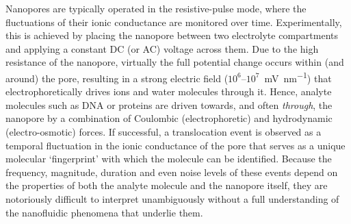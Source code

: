 \documentclass[journal=ancac3,manuscript=article,etalmode=truncate,maxauthors=0,layout=onecolumn]{achemso}
\begin{document}
Nanopores are typically operated in the resistive-pulse mode, where the fluctuations of their ionic
conductance are monitored over time.\cite{Bayley-2001,Dekker-2007,Maglia-2010,Venkatesan-2011} Experimentally,
this is achieved by placing the nanopore between two electrolyte compartments and applying a constant DC (or
AC) voltage across them. Due to the high resistance of the nanopore, virtually the full potential change
occurs within (and around) the pore, resulting in a strong electric field ($10^6$--$10^7$~\si{\mV\per\nm})
that electrophoretically drives ions and water molecules through
it.\cite{Wong-2007,Mao-2014,Haywood-2014,Laohakunakorn-2015} Hence, analyte molecules such as DNA or proteins
are driven towards, and often \emph{through}, the nanopore by a combination of Coulombic (electrophoretic) and
hydrodynamic (electro-osmotic) forces.\cite{Wong-2007,Grosberg-2010,Muthukumar-2010, Muthukumar-2014} If
successful, a translocation event is observed as a temporal fluctuation in the ionic conductance of the pore
that serves as a unique molecular `fingerprint' with which the molecule can be identified.\cite{Yusko-2017}
Because the frequency, magnitude, duration and even noise levels of these events depend on the properties of
both the analyte molecule and the nanopore itself, they are notoriously difficult to interpret unambiguously
without a full understanding of the nanofluidic phenomena that underlie them.
\end{document}
